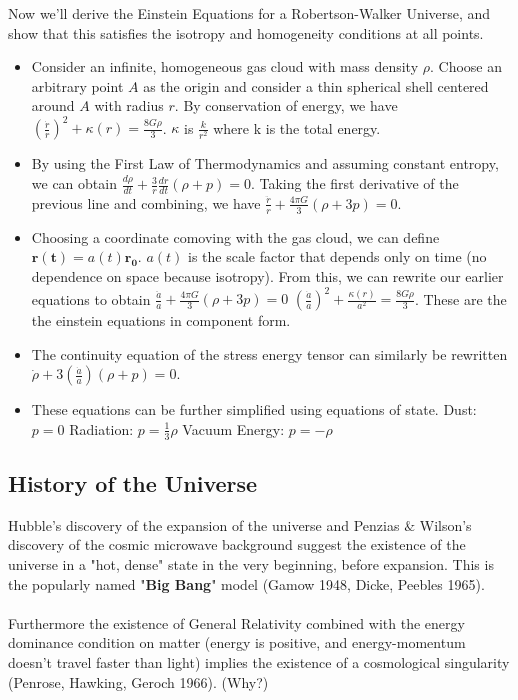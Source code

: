 \documentclass[11pt]{article}
\begin{document}
\noindent Now we'll derive the Einstein Equations for a Robertson-Walker Universe, and show that this satisfies the isotropy and homogeneity conditions at all points.
\begin{itemize}
    \item Consider an infinite, homogeneous gas cloud with mass density $\rho$. Choose an arbitrary point $A$ as the origin and consider a thin spherical shell centered around $A$ with 
    radius $r$. By conservation of energy, we have $(\frac{\dot{r}}{r})^2 + \kappa(r) = \frac{8G\rho}{3}$. $\kappa$ is $\frac{k}{r^2}$ where k is the total energy.
    \item By using the First Law of Thermodynamics and assuming constant entropy, we can obtain $\frac{d\rho}{dt} + \frac{3}{r}\frac{dr}{dt}(\rho + p) = 0$. Taking the first derivative of
    the previous line and combining, we have $\frac{\ddot{r}}{r} + \frac{4\pi G}{3}(\rho + 3p) = 0$. 
    \item Choosing a coordinate comoving with the gas cloud, we can define $\mathbf{r(t)} = a(t)\mathbf{r_0}$. $a(t)$ is the scale factor that depends only on time (no dependence on space because isotropy).
    From this, we can rewrite our earlier equations to obtain
    \newline $\frac{\ddot{a}}{a} + \frac{4\pi G}{3}(\rho + 3p) = 0$
    \newline $(\frac{\dot{a}}{a})^2 + \frac{\kappa(r)}{a^2} = \frac{8G\rho}{3}$. These are the the einstein equations in component form. 
    \item The continuity equation of the stress energy tensor can similarly be rewritten $\dot{\rho}+3(\frac{\dot{a}}{a})(\rho + p) = 0$.
    \item These equations can be further simplified using equations of state. 
    \newline Dust: $p = 0$
    \newline Radiation: $p = \frac{1}{3}\rho$
    \newline Vacuum Energy: $p = -\rho$
\end{itemize}

\subsection{History of the Universe}
\noindent Hubble's discovery of the expansion of the universe and Penzias \( \& \) Wilson's discovery of the cosmic microwave background suggest the existence of the universe in a "hot, dense" state in
the very beginning, before expansion. This is the popularly named "\textbf{Big Bang}" model (Gamow 1948, Dicke, Peebles 1965).
\\
\\
\noindent Furthermore the existence of General Relativity combined with the energy dominance condition on matter (energy is positive, and energy-momentum doesn't travel faster than light) implies the existence
of a cosmological singularity (Penrose, Hawking, Geroch 1966). (Why?)
\end{document}
